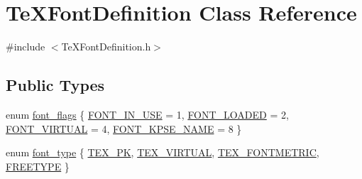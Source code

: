 \hypertarget{classTeXFontDefinition}{\section{Te\+X\+Font\+Definition Class Reference}
\label{classTeXFontDefinition}
}


{\ttfamily \#include $<$Te\+X\+Font\+Definition.\+h$>$}

\subsection*{Public Types}
\begin{DoxyCompactItemize}
\item 
enum \hyperlink{classTeXFontDefinition_a5e758fb1a6ddffb8325b1f893132ce7a}{font\+\_\+flags} \{ \hyperlink{classTeXFontDefinition_a5e758fb1a6ddffb8325b1f893132ce7aa437568b2048a9f1efcce8a3aa0722d70}{F\+O\+N\+T\+\_\+\+I\+N\+\_\+\+U\+S\+E} = 1, 
\hyperlink{classTeXFontDefinition_a5e758fb1a6ddffb8325b1f893132ce7aa1ba1a9855372c90eeab01e3cfa06c83f}{F\+O\+N\+T\+\_\+\+L\+O\+A\+D\+E\+D} = 2, 
\hyperlink{classTeXFontDefinition_a5e758fb1a6ddffb8325b1f893132ce7aadec6d0da445c6ed411d92ccfd61e32bd}{F\+O\+N\+T\+\_\+\+V\+I\+R\+T\+U\+A\+L} = 4, 
\hyperlink{classTeXFontDefinition_a5e758fb1a6ddffb8325b1f893132ce7aaa5817af5df3fc6d468421edb2fff79a6}{F\+O\+N\+T\+\_\+\+K\+P\+S\+E\+\_\+\+N\+A\+M\+E} = 8
 \}
\item 
enum \hyperlink{classTeXFontDefinition_a74669917a483ec5a5c8dd8e0335fbd8b}{font\+\_\+type} \{ \hyperlink{classTeXFontDefinition_a74669917a483ec5a5c8dd8e0335fbd8badb5595948c557dbe78949cac41fd9217}{T\+E\+X\+\_\+\+P\+K}, 
\hyperlink{classTeXFontDefinition_a74669917a483ec5a5c8dd8e0335fbd8ba33cdb392d84daa87be1fc743252ca234}{T\+E\+X\+\_\+\+V\+I\+R\+T\+U\+A\+L}, 
\hyperlink{classTeXFontDefinition_a74669917a483ec5a5c8dd8e0335fbd8ba8429ed809359c8960405c35656222266}{T\+E\+X\+\_\+\+F\+O\+N\+T\+M\+E\+T\+R\+I\+C}, 
\hyperlink{classTeXFontDefinition_a74669917a483ec5a5c8dd8e0335fbd8ba02e2c6c10eba28972b6b809fc7b75d4d}{F\+R\+E\+E\+T\+Y\+P\+E}
 \}
\end{DoxyCompactItemize}
